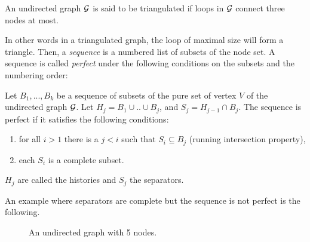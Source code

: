  \begin{definition}
 An undirected graph $\mathcal{G}$ is said to be triangulated if loops in $\mathcal{G}$ connect three nodes at most.
 \end{definition} 
 In other words in a triangulated graph, the loop of maximal size will form a triangle. Then, a \textit{sequence} is a numbered list of subsets of the node set. A sequence is called \textit{perfect} under the following conditions on the subsets and the numbering order:
 \begin{definition}\label{def:seq}
 Let $B_1,...,B_k$ be a sequence of subsets of the pure set of vertex $V$ of the undirected graph $\mathcal{G}$. Let $H_j=B_1\cup .. \cup B_j$, and $S_j = H_{j-1} \cap B_j$. The sequence is perfect if it satisfies the following conditions:
 \begin{enumerate}[label=(\roman*)]
 \item for all $i>1$ there is a $j<i$ such that $S_i \subseteq B_j$ (running intersection property),
 \item each $S_i$ is a complete subset.
 \end{enumerate}
 $H_j$ are called the histories and $S_j$ the separators.
 \end{definition}
 An example where separators are complete but the sequence is not perfect is the following.
\begin{figure}[H]
 \begin{center}
 \caption{An undirected graph with 5 nodes.}
  \label{ex:graph1}
    \end{center}
\end{figure}
